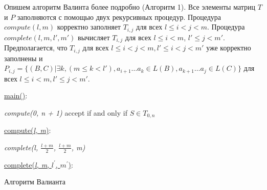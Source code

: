 \documentclass[14pt]{matmex-diploma-custom}
\begin{document}
Опишем алгоритм Валинта более подробно (Алгоритм 1). 
Все элементы матриц $T$ и $P$ заполняются с помощью двух рекурсивных процедур.
Процедура $compute(l, m)$ корректно заполняет $T_{i,j}$ для всех $l \le i < j < m$.
Процедура $complete(l, m, l', m')$ вычисляет $T_{i, j}$ для всех $l \le i < m$, $l' \le j < m'$. Предполагается, что $T_{i, j}$ для всех $l \leq i < j < m,  l' \leq i < j < m'$ уже корректно заполнены и $P_{i, j} =  \{ (B, C) |\exists k, (m \le k < l'), a_{i + 1} \dots a_{k} \in L(B), a_{k + 1} \dots a_{j} \in L(C)\}$ для всех $l \leq i < m,  l' \leq j < m'$.

\begin{algorithm}[h]
\SetAlgoNoLine
{}
\underline{main()}{:}{

 \textit{compute(0, n + 1)\;}
 accept if and only if $S \in T_{0, n}$
 \linebreak
 }

\underline{compute(\textit{l, m})}{:}{

 \textit{complete(l, $\frac{l+m}{2}$, $\frac{l+m}{2}$, m)}
 \linebreak
 }

\underline{complete(\textit{l, m}, $l^\prime$, $m^\prime$)}{:}{

 }
\caption{Алгоритм Валианта}
\label{algo:valiant}
\end{algorithm}
\end{document}
